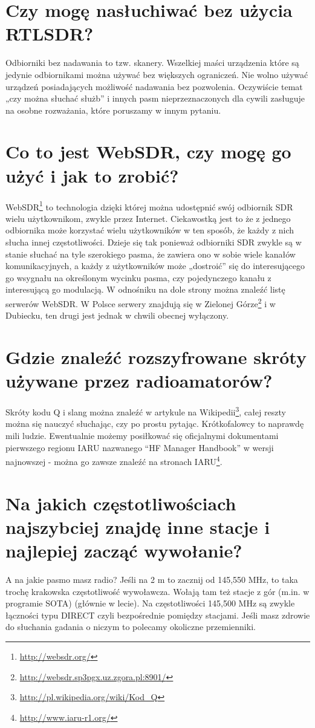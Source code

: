 \documentclass[a4paper,12pt]{article}
\begin{document}
\section{Czy mogę nasłuchiwać bez użycia RTLSDR?}
Odbiorniki bez nadawania to tzw. skanery. Wszelkiej maści urządzenia które są jedynie odbiornikami można używać bez większych ograniczeń. Nie wolno używać urządzeń posiadających możliwość nadawania bez pozwolenia. Oczywiście temat „czy można słuchać służb” i innych pasm nieprzeznaczonych dla cywili zasługuje na osobne rozważania, które poruszamy w innym pytaniu.

\section{Co to jest WebSDR, czy mogę go użyć i jak to zrobić?}
WebSDR\footnote{\url{http://websdr.org/}} to technologia dzięki której można udostępnić swój odbiornik SDR wielu użytkownikom, zwykle przez Internet. Ciekawostką jest to że z jednego odbiornika może korzystać wielu użytkowników w ten sposób, że każdy z nich słucha innej częstotliwości. Dzieje się tak ponieważ odbiorniki SDR zwykle są w stanie słuchać na tyle szerokiego pasma, że zawiera ono w sobie wiele kanałów komunikacyjnych, a każdy z użytkowników może „dostroić” się do interesującego go wsygnału na określonym wycinku pasma, czy pojedynczego kanału z interesującą go modulacją. W odnośniku na dole strony można znaleźć listę serwerów WebSDR. W Polsce serwery znajdują się w Zielonej Górze\footnote{\url{http://websdr.sp3pgx.uz.zgora.pl:8901/}} i w Dubiecku, ten drugi jest jednak w chwili obecnej wyłączony.


\section{Gdzie znaleźć rozszyfrowane skróty używane przez radioamatorów?}
Skróty kodu Q i slang można znaleźć w artykule na Wikipedii\footnote{\url{http://pl.wikipedia.org/wiki/Kod_Q}}, całej reszty można się nauczyć słuchając, czy po prostu pytając. Krótkofalowcy to naprawdę mili ludzie. Ewentualnie możemy posiłkować się oficjalnymi dokumentami pierwszego regionu IARU nazwanego “HF Manager Handbook” w wersji najnowszej - można go zawsze znaleźć na stronach IARU\footnote{\url{http://www.iaru-r1.org/}}.

\section{Na jakich częstotliwościach najszybciej znajdę inne stacje i najlepiej zacząć wywołanie?}
A na jakie pasmo masz radio?
Jeśli na 2 m to zacznij od 145,550 MHz, to taka trochę krakowska częstotliwość wywoławcza. Wołają tam też stacje z gór (m.in. w programie SOTA) (głównie w lecie). Na częstotliwości 145,500 MHz są zwykle łączności typu DIRECT czyli bezpośrednie pomiędzy stacjami. Jeśli masz zdrowie do słuchania gadania o niczym to polecamy okoliczne przemienniki.
\end{document}
